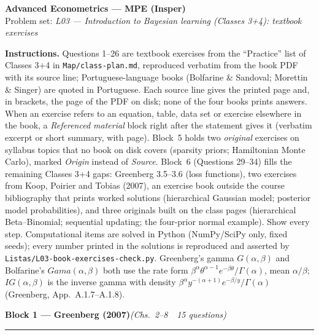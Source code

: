 \documentclass[11pt,a4paper]{article}
\newif\ifsolucoes
\newcommand{\disciplina}{Advanced Econometrics --- MPE (Insper)}
\newcommand{\listatema}{\textit{L03 --- Introduction to Bayesian learning (Classes 3+4): textbook exercises}}
\newcommand{\bloco}[3]{\bigskip\noindent
  {\large\bfseries\color{blue!55!black}Block #1 --- #2}\hfill\textit{(#3)}\par
  \noindent\rule{\linewidth}{0.3pt}\smallskip}
\begin{document}
\begin{center}
  {\Large\bfseries \disciplina}\\[2pt]
  {\large Problem set: \listatema}\ifsolucoes\\[2pt]\textit{Solutions}\fi
\end{center}
\vspace{2pt}

{\footnotesize\noindent\textbf{Instructions.} Questions 1--26 are textbook exercises from the
``Practice'' list of Classes 3+4 in \texttt{Map/class-plan.md}, reproduced verbatim from the book PDF
with its source line; Portuguese-language books (Bolfarine \& Sandoval; Morettin \& Singer) are quoted
in Portuguese. Each source line gives the printed page and, in brackets, the page of the PDF on disk;
none of the four books prints answers. When an exercise refers to an equation, table, data set or
exercise elsewhere in the book, a \emph{Referenced material} block right after the statement gives it
(verbatim excerpt or short summary, with page). Block~5 holds two \emph{original} exercises on syllabus
topics that no book on disk covers (sparsity priors; Hamiltonian Monte Carlo), marked
\emph{Origin} instead of \emph{Source}. Block~6 (Questions 29--34) fills the remaining Classes 3+4 gaps:
Greenberg 3.5--3.6 (loss functions), two exercises from Koop, Poirier and Tobias (2007), an exercise book
outside the course bibliography that prints worked solutions (hierarchical Gaussian model; posterior model
probabilities), and three originals built on the class pages (hierarchical Beta--Binomial; sequential
updating; the four-prior normal example). Show every step. Computational items are solved in Python
(NumPy/SciPy only, fixed seeds); every number printed in the solutions is reproduced and asserted by
\texttt{Listas/L03-book-exercises-check.py}. Greenberg's gamma $G(\alpha,\beta)$ and Bolfarine's
$Gama(\alpha,\beta)$ both use the rate form $\beta^\alpha\theta^{\alpha-1}e^{-\beta\theta}/\Gamma(\alpha)$,
mean $\alpha/\beta$; $IG(\alpha,\beta)$ is the inverse gamma with density
$\beta^\alpha y^{-(\alpha+1)}e^{-\beta/y}/\Gamma(\alpha)$ (Greenberg, App.~A.1.7--A.1.8).\par}

\bloco{1}{Greenberg (2007)}{Chs.~2--8 \,\textbullet\, 15 questions}
\end{document}
